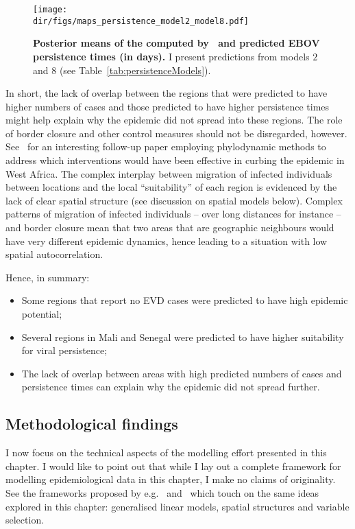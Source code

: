 \begin{figure}[htbp]
  \centering
  \texttt{[image: \\dir/figs/maps\_persistence\_model2\_model8.pdf]}
  \caption[Persistence times predictions]{\textbf{Posterior means of the computed by~\cite{Dudas2017} and predicted EBOV persistence times (in days).}
  I present predictions from models $2$ and $8$ (see Table~\ref{tab:persistenceModels}).
  }
  \label{fig:mapsPersistence}
\end{figure}


In short, the lack of overlap between the regions that were predicted to have higher numbers of cases and those predicted to have higher persistence times might help explain why the epidemic did not spread into these regions.
The role of border closure and other control measures should not be disregarded, however.
See~\cite{Dellicour2017} for an interesting follow-up paper employing phylodynamic methods to address which interventions would have been effective in curbing the epidemic in West Africa.
The complex interplay between migration of infected individuals between locations and the local ``suitability'' of each region is evidenced by the lack of clear spatial structure (see discussion on spatial models below).
Complex patterns of migration of infected individuals -- over long distances for instance -- and border closure mean that two areas that are geographic neighbours would have very different epidemic dynamics, hence leading to a situation with low spatial autocorrelation.


Hence, in summary:
\begin{itemize}
 \item Some regions that report no EVD cases were  predicted to have high epidemic potential;
 \item Several regions in Mali and Senegal were predicted to have higher suitability for viral persistence;
 \item The lack of overlap between areas with high predicted numbers of cases and persistence times can explain why the epidemic did not spread further.
\end{itemize}


\subsection*{Methodological findings}

I now focus on the technical aspects of the modelling effort presented in this chapter.
I would like to point out that while I lay out a complete framework for modelling epidemiological data in this chapter, I make no claims of originality.
See the frameworks proposed by e.g.~\cite{Scheel2013} and~\cite{Boehm2015} which touch on the same ideas explored in this chapter: generalised linear models, spatial structures and variable selection.

